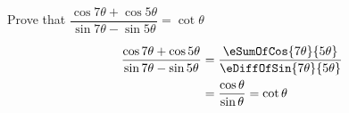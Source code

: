 
%
%
%
%
% 
% 

\question[1] Prove that $\dfrac{\cos 7\theta + \cos 5\theta}{\sin 7\theta - \sin 5\theta} = \cot\theta$


\ifprintanswers
\fi 

\begin{solution}[\mcq]
	\begin{align}
		\dfrac{\cos 7\theta + \cos 5\theta}{\sin 7\theta - \sin 5\theta} &= 
		\dfrac{\eSumOfCos{7\theta}{5\theta}}{\eDiffOfSin{7\theta}{5\theta}} \\
		&= \dfrac{\cos\theta}{\sin\theta} = \cot\theta
	\end{align}
\end{solution}
